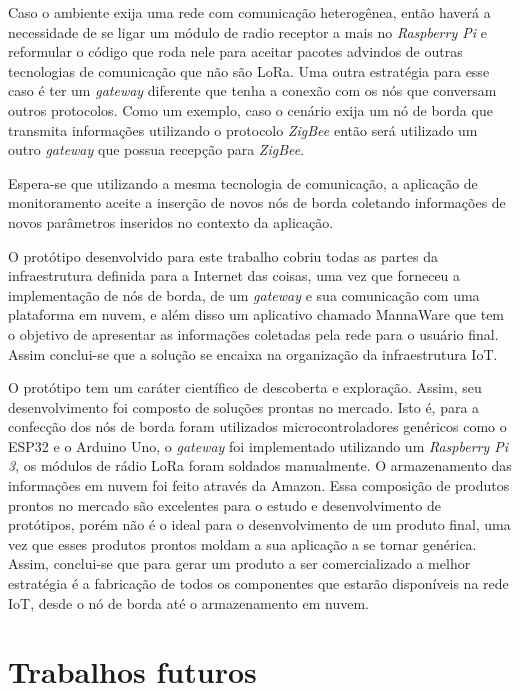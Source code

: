 \documentclass[
    hidelinks,
	12pt,				%
	openany,
	oneside, 
	a4paper,			%
	english,			%
	french,				%
	spanish,			%
	brazil				%
	]{abntex2}
\begin{document}
Caso o ambiente exija uma rede com comunicação heterogênea, então haverá a necessidade de se ligar um módulo de radio receptor a mais no \textit{Raspberry Pi} e reformular o código que roda nele para aceitar pacotes advindos de outras tecnologias de comunicação que não são LoRa. Uma outra estratégia para esse caso é ter um \textit{gateway} diferente que tenha a conexão com os nós que conversam outros protocolos. Como um exemplo, caso o cenário exija um nó de borda que transmita informações utilizando o protocolo \textit{ZigBee} então será utilizado um outro \textit{gateway} que possua recepção para \textit{ZigBee}. 

Espera-se que utilizando a mesma tecnologia de comunicação, a aplicação de monitoramento aceite a inserção de novos nós de borda coletando informações de novos parâmetros inseridos no contexto da aplicação.

O protótipo desenvolvido para este trabalho cobriu todas as partes da infraestrutura definida para a Internet das coisas, uma vez que forneceu a implementação de nós de borda, de um \textit{gateway} e sua comunicação com uma plataforma em nuvem, e além disso um aplicativo chamado MannaWare que tem o objetivo de apresentar as informações coletadas pela rede para o usuário final. Assim conclui-se que a solução se encaixa na organização da infraestrutura IoT.

O protótipo tem um caráter científico de descoberta e exploração. Assim, seu desenvolvimento foi composto de soluções prontas no mercado. Isto é, para a confecção dos nós de borda foram utilizados microcontroladores genéricos como o ESP32 e o Arduino Uno, o \textit{gateway} foi implementado utilizando um \textit{Raspberry Pi 3}, os módulos de rádio LoRa foram soldados manualmente. O armazenamento das informações em nuvem foi feito através da Amazon. Essa composição de produtos prontos no mercado são excelentes para o estudo e desenvolvimento de protótipos, porém não é o ideal para o desenvolvimento de um produto final, uma vez que esses produtos prontos moldam a sua aplicação a se tornar genérica. Assim, conclui-se que para gerar um produto a ser comercializado a melhor estratégia é a fabricação de todos os componentes que estarão disponíveis na rede IoT, desde o nó de borda até o armazenamento em nuvem.

\section{Trabalhos futuros}
\end{document}
